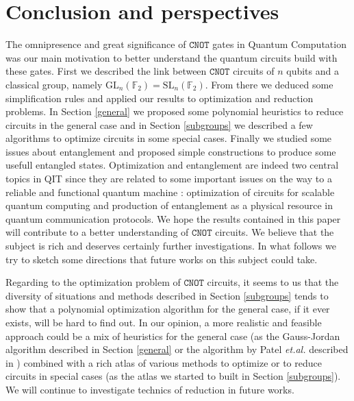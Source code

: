 \documentclass[a4paper,12pt,fleqn]{article}
\newcommand\cnot{\mathtt{CNOT}}
\newcommand\SL[1][n]{\mathrm{SL}_{#1}(\mathbb{F}_2)}
\newcommand\GL[1][n]{\mathrm{GL}_{#1}(\mathbb{F}_2)}
\begin{document}
\section{Conclusion and perspectives}
The omnipresence and great significance of $\cnot$ gates in Quantum Computation was our main motivation to better understand the quantum circuits build with these gates. First we described the link between $\cnot$ circuits of $n$ qubits and a classical group,  namely $\GL=\SL$. From there we deduced some simplification rules and applied our results to optimization and reduction problems. In Section \ref{general} we proposed some polynomial heuristics to reduce circuits in the general case  and in Section \ref{subgroups} we described a few algorithms to optimize circuits in some special cases. Finally we studied some issues about entanglement and proposed simple constructions to produce some usefull entangled states. Optimization and entanglement are indeed two central topics in QIT since they are related to some important issues on the way to a reliable and functional quantum machine : optimization of circuits for scalable quantum computing and production of entanglement as a physical resource in quantum communication protocols.
We hope the results contained in this paper will contribute to a better understanding of $\cnot$ circuits. We believe that the subject is rich and deserves certainly further investigations. In what follows we try to sketch some directions that future works on
this subject could take.\medskip 

Regarding to the optimization problem  of $\cnot$ circuits, it seems to us that the diversity of situations and methods described in Section \ref{subgroups} tends to show that a polynomial optimization algorithm for the  general case, if it ever exists, will be hard to find out. In our opinion, a more realistic and feasible approach could be a mix of heuristics for the general case (as the Gauss-Jordan algorithm described in Section \ref{general} or the algorithm by Patel \textit{et.al.} described in \cite{2004PMH}) combined with a rich atlas of various methods to optimize or to reduce circuits in special cases (as the atlas we started to built in Section \ref{subgroups}). We will continue to investigate technics of reduction in future works. \medskip
\end{document}
